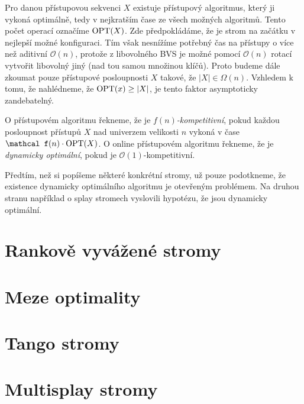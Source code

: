 Pro danou přístupovou sekvenci $X$ existuje přístupový algoritmus, který ji
vykoná optimálně, tedy v nejkratším čase ze všech možných algoritmů. Tento
počet operací označíme $\operatorname{OPT}(X)$. Zde předpokládáme, že je strom na začátku v
nejlepší možné konfiguraci. Tím však nesnížíme potřebný čas na přístupy o více
než aditivní $\mathcal O(n)$, protože z libovolného BVS je možné pomocí
$\mathcal O(n)$ rotací vytvořit libovolný jiný (nad tou samou množinou klíčů).
Proto budeme dále zkoumat pouze přístupové posloupnosti $X$ takové, že $|X| \in
\Omega(n)$. Vzhledem k tomu, že nahlédneme, že $\operatorname{OPT}(x)\geq |X|$, je tento
faktor asymptoticky zandebatelný. 


\begin{definice}
O přístupovém algoritmu řekneme, že je \emph{$f(n)$-kompetitivní}, pokud každou
posloupnost přístupů $X$ nad univerzem velikosti $n$ vykoná v čase $\mathcal
f(n)\cdot\opt(X)$. O online přístupovém algoritmu řekneme, že je
\emph{dynamicky optimální}, pokud je $\mathcal O(1)$-kompetitivní.
\end{definice}

Předtím, než si popíšeme některé konkrétní stromy, už pouze podotkneme, že
existence dynamicky optimálního algoritmu je otevřeným problémem. Na druhou
stranu například o splay stromech vyslovili \citet{splay} hypotézu, že jsou
dynamicky optimální.

\section{Rankově vyvážené stromy}

\section{Meze optimality}

\section{Tango stromy}

\section{Multisplay stromy}
